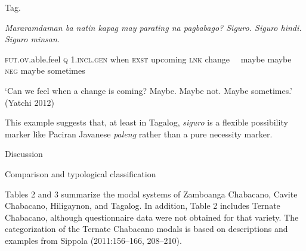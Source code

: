 \begin{listWWNumiileveli}
\item 
\begin{stylelsLanginfo}
\label{bkm:Ref52833713}Tag.
\end{stylelsLanginfo}
\end{listWWNumiileveli}
\begin{stylelsLanginfo}
\textit{Mararamdaman ba natin kapag may parating na pagbabago? Siguro. Siguro hindi. Siguro minsan.}
\end{stylelsLanginfo}

\begin{styleTextbodyindent}
\textsc{fut.ov}.able.feel \textsc{q} 1.\textsc{incl.gen} when \textsc{exst} upcoming \textsc{lnk} change \ \ maybe maybe \textsc{neg} maybe sometimes
\end{styleTextbodyindent}

\begin{styleTextbodyindent}
‘Can we feel when a change is coming? Maybe. Maybe not. Maybe sometimes.’ (Yatchi 2012)
\end{styleTextbodyindent}

\begin{styleStandard}
This example suggests that, at least in Tagalog, \textit{siguro} is a flexible possibility marker like Paciran Javanese \textit{paleng} rather than a pure necessity marker.
\end{styleStandard}


\setcounter{listWWNumiiileveli}{0}
\begin{listWWNumiiileveli}
\item 
\begin{stylelsSectioni}
Discussion
\end{stylelsSectioni}


\setcounter{listWWNumiiilevelii}{0}
\begin{listWWNumiiilevelii}
\item 
\begin{stylelsSectionii}
Comparison and typological classification
\end{stylelsSectionii}
\end{listWWNumiiilevelii}
\end{listWWNumiiileveli}
\begin{styleStandard}
Tables 2 and 3 summarize the modal systems of Zamboanga Chabacano, Cavite Chabacano, Hiligaynon, and Tagalog. In addition, Table 2 includes Ternate Chabacano, although questionnaire data were not obtained for that variety. The categorization of the Ternate Chabacano modals is based on descriptions and examples from Sippola (2011:156–166, 208–210). 
\end{styleStandard}

